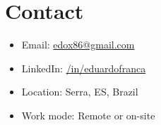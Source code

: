 \documentclass[11pt,a4paper,sans]{moderncv}
\begin{document}
\section{Contact}
\begin{itemize}
\item Email: \href{mailto:edox86@gmail.com}{edox86@gmail.com}
\item LinkedIn: \href{https://www.linkedin.com/in/eduardofranca/}{/in/eduardofranca}
\item Location: Serra, ES, Brazil
\item Work mode: Remote or on-site
\end{itemize}
\end{document}
